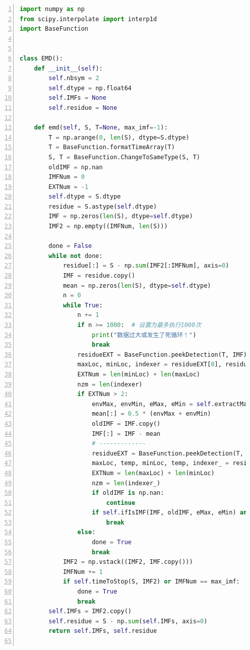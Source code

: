 \documentclass[cs4size,a4paper]{ctexart}
\numberwithin{equation}{section}
\numberwithin{table}{section}
\numberwithin{figure}{section}
\begin{document}
\begin{lstlisting}[language={python},
numbers=left,
numberstyle=\tiny\monaco,
basicstyle=\footnotesize\monaco]
import numpy as np
from scipy.interpolate import interp1d
import BaseFunction


class EMD():
    def __init__(self):
        self.nbsym = 2
        self.dtype = np.float64
        self.IMFs = None
        self.residue = None

    def emd(self, S, T=None, max_imf=-1):
        T = np.arange(0, len(S), dtype=S.dtype)
        T = BaseFunction.formatTimeArray(T)
        S, T = BaseFunction.ChangeToSameType(S, T)
        oldIMF = np.nan
        IMFNum = 0
        EXTNum = -1
        self.dtype = S.dtype
        residue = S.astype(self.dtype)
        IMF = np.zeros(len(S), dtype=self.dtype)
        IMF2 = np.empty((IMFNum, len(S)))
        
        done = False
        while not done:
            residue[:] = S - np.sum(IMF2[:IMFNum], axis=0)
            IMF = residue.copy()
            mean = np.zeros(len(S), dtype=self.dtype)
            n = 0
            while True:
                n += 1
                if n >= 1000:  # 设置为最多执行1000次
                    print("数据过大或发生了死循环！")
                    break
                residueEXT = BaseFunction.peekDetection(T, IMF)
                maxLoc, minLoc, indexer = residueEXT[0], residueEXT[2], residueEXT[4]
                EXTNum = len(minLoc) + len(maxLoc)
                nzm = len(indexer)
                if EXTNum > 2:
                    envMax, envMin, eMax, eMin = self.extractMaxAndMinSpline(T, IMF)
                    mean[:] = 0.5 * (envMax + envMin)
                    oldIMF = IMF.copy()
                    IMF[:] = IMF - mean
                    # -------------
                    residueEXT = BaseFunction.peekDetection(T, IMF)
                    maxLoc, temp, minLoc, temp, indexer_ = residueEXT
                    EXTNum = len(maxLoc) + len(minLoc)
                    nzm = len(indexer_)
                    if oldIMF is np.nan:
                        continue
                    if self.ifIsIMF(IMF, oldIMF, eMax, eMin) and abs(EXTNum - nzm) < 2:
                        break
                else:
                    done = True
                    break
            IMF2 = np.vstack((IMF2, IMF.copy()))
            IMFNum += 1
            if self.timeToStop(S, IMF2) or IMFNum == max_imf:
                done = True
                break
        self.IMFs = IMF2.copy()
        self.residue = S - np.sum(self.IMFs, axis=0)
        return self.IMFs, self.residue


\end{lstlisting}
\end{document}
